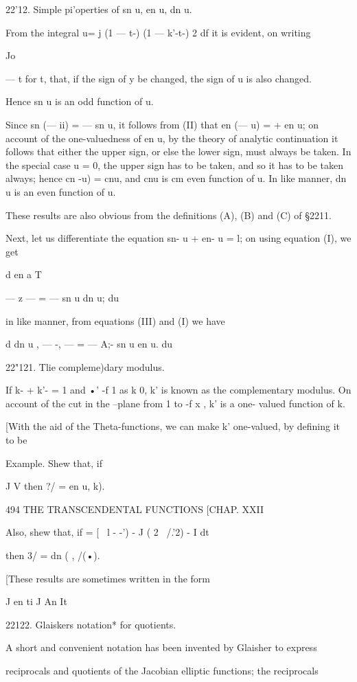 22'12. Simple pi'operties of sn u, en u, dn u.

From the integral u= j (1 — t-) (1 — k'-t-) 2 df it is evident, on
writing

Jo

— t for t, that, if the sign of y be changed, the sign of u is also
changed.

Hence sn u is an odd function of u.

Since sn (— ii) = — sn u, it follows from (II) that en (— u) = + en u;
on account of the one-valuedness of en u, by the theory of analytic
continuation it follows that either the upper sign, or else the lower
sign, must always be taken. In the special case u = 0, the upper sign
has to be taken, and so it has to be taken always; hence cn -u) = cnu,
and cnu is cm even function of u. In like manner, dn u is an even
function of u.

These results are also obvious from the definitions (A), (B) and (C)
of §2211.

Next, let us differentiate the equation sn- u + en- u = l; on using
equation (I), we get

d en a T

— z — = — sn u dn u; du

in like manner, from equations (III) and (I) we have

d dn u , — -, — = — A;- sn u en u. du

22"121. Tlie compleme)dary modulus.

If k- + k'- = 1 and •' -f 1 as k 0, k' is known as the complementary
modulus. On account of the cut in the --plane from 1 to -f x , k' is a
one- valued function of k.

[With the aid of the Theta-functions, we can make k' one-valued, by
defining it to be

Example. Shew that, if

J V then ?/ = en u, k).

494 THE TRANSCENDENTAL FUNCTIONS [CHAP. XXII

Also, shew that, if = [ \ l - -') - J ( 2 \ /.'2) - I dt

then 3/ = dn ( , /(•).

[These results are sometimes written in the form

J en ti J An It

22122. Glaiskers notation* for quotients.

A short and convenient notation has been invented by Glaisher to
express

reciprocals and quotients of the Jacobian elliptic functions; the
reciprocals

